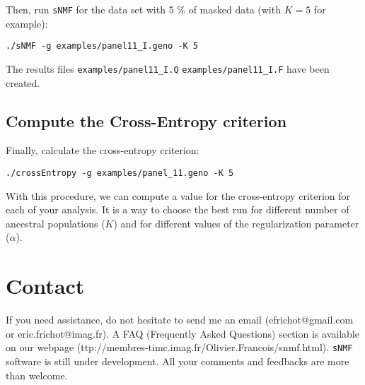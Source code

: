 \documentclass[10pt,a4paper]{article}
\begin{document}
Then, run {\tt sNMF} for the data set with 5 \% of masked data (with $K=5$ for example):
\begin{Verbatim}[frame=single]
./sNMF -g examples/panel11_I.geno -K 5
\end{Verbatim}

\noindent
The results files \verb|examples/panel11_I.Q| \verb|examples/panel11_I.F| have been created.

\subsection{Compute the Cross-Entropy criterion}

Finally, calculate the cross-entropy criterion:
\begin{Verbatim}[frame=single]
./crossEntropy -g examples/panel_11.geno -K 5
\end{Verbatim}

\noindent
With this procedure, we can compute a value for the cross-entropy criterion for each of your analysis. 
It is a way to  choose the best run for different number of ancestral populations ($K$) and for 
different values of the regularization parameter ($\alpha$).

\section{Contact}
If you need assistance, do not hesitate to send me an email (efrichot@gmail.com or eric.frichot@imag.fr). 
A FAQ (Frequently Asked Questions) section is available 
on our webpage (ttp://membres-timc.imag.fr/Olivier.Francois/snmf.html). 
{\tt sNMF} software is still under development. All your comments and feedbacks are more than welcome.



\end{document}
